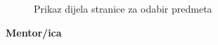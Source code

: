 \documentclass[times, utf8, zavrsni, numeric]{fer}
\begin{document}
    \begin{figure} [H]
      \centering
      \caption{Prikaz dijela stranice za odabir predmeta}
    \end{figure}
    
    \noindent\textbf{Mentor/ica}
    
\end{document}
